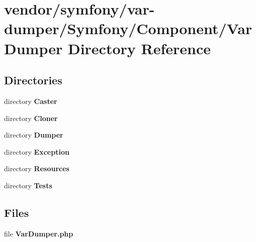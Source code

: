 \section{vendor/symfony/var-\/dumper/\+Symfony/\+Component/\+Var\+Dumper Directory Reference}
\label{dir_094eabf9da7b1ec4b9fb0635a054246a}
\subsection*{Directories}
\begin{DoxyCompactItemize}
\item 
directory {\bf Caster}
\item 
directory {\bf Cloner}
\item 
directory {\bf Dumper}
\item 
directory {\bf Exception}
\item 
directory {\bf Resources}
\item 
directory {\bf Tests}
\end{DoxyCompactItemize}
\subsection*{Files}
\begin{DoxyCompactItemize}
\item 
file {\bf Var\+Dumper.\+php}
\end{DoxyCompactItemize}
